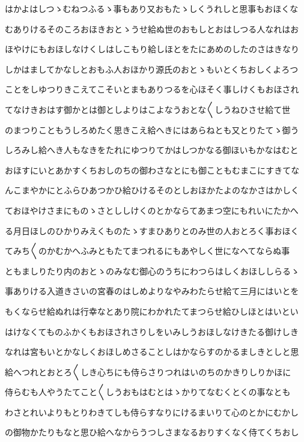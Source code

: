 \documentclass[a4paper,11pt,landscape]{ltjtarticle}
\begin{document}
はかよはしつゝむねつふるゝ事もあり又おもたゝしくうれしと思事もおほくな
\par\medskip
むありけるそのころおほきおとゝうせ給ぬ世のおもしとおはしつる人なれはお
\par\medskip
ほやけにもおほしなけくしはしこもり給しほとをたにあめのしたのさはきなり
\par\medskip
しかはましてかなしとおもふ人おほかり源氏のおとゝもいとくちおしくよろつ
\par\medskip
ことをしゆつりきこえてこそいとまもありつるを心ほそく事しけくもおほされ
\par\medskip
てなけきおはす御かとは御としよりはこよなうおとな〱しうねひさせ給て世
\par\medskip
のまつりこともうしろめたく思きこえ給へきにはあらねとも又とりたてゝ御う
\par\medskip
しろみし給へき人もなきをたれにゆつりてかはしつかなる御ほいもかなはむと
\par\medskip
おほすにいとあかすくちおしのちの御わさなとにも御こともむまこにすきてな
\par\medskip
んこまやかにとふらひあつかひ給ひけるそのとしおほかたよのなかさはかしく
\par\medskip
ておほやけさまにものゝさとししけくのとかならてあまつ空にもれいにたかへ
\par\medskip
る月日ほしのひかりみえくものたゝすまひありとのみ世の人おとろく事おほく
\par\medskip
てみち〱のかむかへふみともたてまつれるにもあやしく世になへてならぬ事
\par\medskip
ともましりたり内のおとゝのみなむ御心のうちにわつらはしくおほししらるゝ
\par\medskip
事ありける入道きさいの宮春のはしめよりなやみわたらせ給て三月にはいとを
\par\medskip
もくならせ給ぬれは行幸なとあり院にわかれたてまつらせ給ひしほとはいとい
\par\medskip
はけなくてものふかくもおほされさりしをいみしうおほしなけきたる御けしき
\par\medskip
なれは宮もいとかなしくおほしめさることしはかならすのかるましきとしと思
\par\medskip
給へつれとおとろ〱しき心ちにも侍らさりつれはいのちのかきりしりかほに
\par\medskip
侍らむも人やうたてこと〱しうおもはむとはゝかりてなむくとくの事なとも
\par\medskip
わさとれいよりもとりわきてしも侍らすなりにけるまいりて心のとかにむかし
\par\medskip
の御物かたりもなと思ひ給へなからうつしさまなるおりすくなく侍てくちおし
\end{document}

